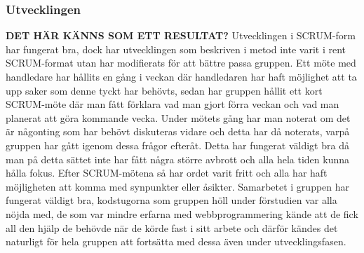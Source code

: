 \documentclass{article}
\begin{document}
\subsubsection{Utvecklingen}
\textbf{DET HÄR KÄNNS SOM ETT RESULTAT?}
Utvecklingen i SCRUM-form har fungerat bra, dock har utvecklingen som beskriven i metod inte varit i rent SCRUM-format utan har modifierats för att bättre passa gruppen. Ett möte med handledare har hållits en gång i veckan där handledaren har haft möjlighet att ta upp saker som denne tyckt har behövts, sedan har gruppen hållit ett kort SCRUM-möte där man fått förklara vad man gjort förra veckan och vad man planerat att göra kommande vecka. Under mötets gång har man noterat om det är någonting som har behövt diskuteras vidare och detta har då noterats, varpå gruppen har gått igenom dessa frågor efteråt. Detta har fungerat väldigt bra då man på detta sättet inte har fått några större avbrott och alla hela tiden kunna hålla fokus. Efter SCRUM-mötena så har ordet varit fritt och alla har haft möjligheten att komma med synpunkter eller åsikter. Samarbetet i gruppen har fungerat väldigt bra, kodstugorna som gruppen höll under förstudien var alla nöjda med, de som var mindre erfarna med webbprogrammering kände att de fick all den hjälp de behövde när de körde fast i sitt arbete och därför kändes det naturligt för hela gruppen att fortsätta med dessa även under utvecklingsfasen.
\end{document}

